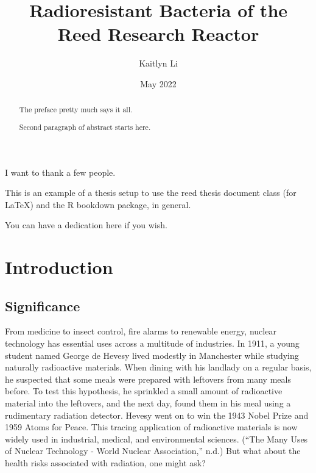 \documentclass[12pt,twoside]{reedthesis}
\title{Radioresistant Bacteria of the Reed Research Reactor}
\author{Kaitlyn Li}
\date{May 2022}
\begin{document}
  \maketitle

\frontmatter %
\pagestyle{empty} %
  \begin{acknowledgements}
    I want to thank a few people.
  \end{acknowledgements}
  \begin{preface}
    This is an example of a thesis setup to use the reed thesis document class
    (for LaTeX) and the R bookdown package, in general.
  \end{preface}
  \hypersetup{linkcolor=black}
  \setcounter{secnumdepth}{2}
  \setcounter{tocdepth}{2}
  \tableofcontents

  \listoftables

  \listoffigures
  \begin{abstract}
    The preface pretty much says it all.
    
    \par
    
    Second paragraph of abstract starts here.
  \end{abstract}
  \begin{dedication}
    You can have a dedication here if you wish.
  \end{dedication}
\mainmatter %
\pagestyle{fancyplain} %

\hypertarget{introduction}{%
\chapter*{Introduction}\label{introduction}}

\hypertarget{significance}{%
\section{Significance}\label{significance}}

From medicine to insect control, fire alarms to renewable energy, nuclear technology has essential uses across a multitude of industries. In 1911, a young student named George de Hevesy lived modestly in Manchester while studying naturally radioactive materials. When dining with his landlady on a regular basis, he suspected that some meals were prepared with leftovers from many meals before. To test this hypothesis, he sprinkled a small amount of radioactive material into the leftovers, and the next day, found them in his meal using a rudimentary radiation detector. Hevesy went on to win the 1943 Nobel Prize and 1959 Atoms for Peace. This tracing application of radioactive materials is now widely used in industrial, medical, and environmental sciences. (``The Many Uses of Nuclear Technology - World Nuclear Association,'' n.d.) But what about the health risks associated with radiation, one might ask?
\end{document}
